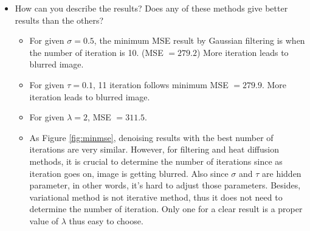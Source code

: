 \documentclass[paper=a4, fontsize=11pt]{scrartcl} %
\numberwithin{equation}{section} %
\numberwithin{figure}{section} %
\numberwithin{table}{section} %
\begin{document}
\begin{itemize}
	\item How can you describe the results? Does any of these methods give better results than the others? \\
	
	\begin{itemize}
		\item For given $\sigma = 0.5$, the minimum MSE result by Gaussian filtering is when the number of iteration is 10. (MSE $= 279.2$) More iteration leads to blurred image.
		\item For given $\tau = 0.1$, 11 iteration follows minimum MSE $= 279.9$. More iteration leads to blurred image.
		\item For given $\lambda = 2$, MSE $= 311.5$.
		\item As Figure \ref{fig:minmse}, denoising results with the best number of iterations are very similar. However, for filtering and heat diffusion methods, it is crucial to determine the number of iterations since as iteration goes on, image is getting blurred. Also since $\sigma$ and $\tau$ are hidden parameter, in other words, it's hard to adjust those parameters. Besides, variational method is not iterative method, thus it does not need to determine the number of iteration. Only one for a clear result is a proper value of $\lambda$ thus easy to choose.
	

\end{itemize}
\end{itemize}
\end{document}

